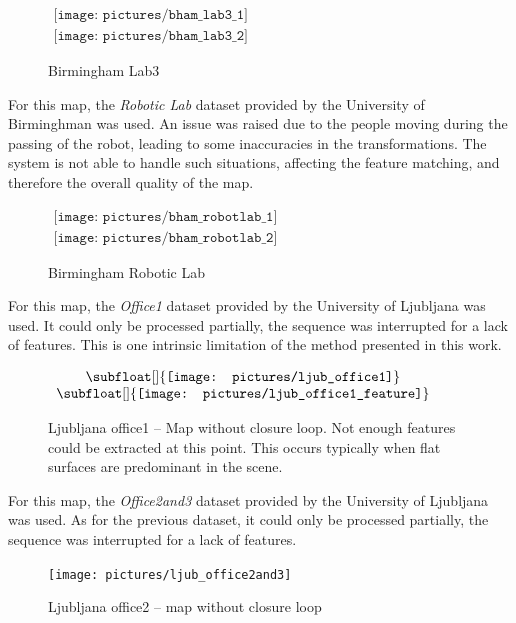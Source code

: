 \begin{figure}[H]
\centering$
 \begin{array}{c}
 \texttt{[image: pictures/bham\_lab3\_1]} \\
 \texttt{[image: pictures/bham\_lab3\_2]}
 \end{array}$
\caption{Birmingham Lab3}
\end{figure}

\clearpage
For this map, the \emph{Robotic Lab} dataset provided by the University of Birminghman was used. An issue was raised due to the people moving during the passing of the robot, leading to some inaccuracies in the transformations. The system is not able to handle such situations, affecting the feature matching, and therefore the overall quality of the map.

\begin{figure}[H]
\centering$
\begin{array}{c}
\texttt{[image: pictures/bham\_robotlab\_1]} \\
\texttt{[image: pictures/bham\_robotlab\_2]}
\end{array}$
\caption{Birmingham Robotic Lab}
\end{figure}

\clearpage
For this map, the \emph{Office1} dataset provided by the University of Ljubljana was used. It could only be processed partially, the sequence was interrupted for a lack of features. This is one intrinsic limitation of the method presented in this work.

\begin{figure}[H]
\centering$
 \begin{array}{c}
 \subfloat[]{\label{fig:ljub1_1} \texttt{[image: pictures/ljub\_office1]}} \\
 \subfloat[]{\label{fig:ljub1_2} \texttt{[image: pictures/ljub\_office1\_feature]}}
 \end{array}$
\caption{Ljubljana office1 -- \protect{} Map without closure loop. \protect{} Not enough features could be extracted at this point. This occurs typically when flat surfaces are predominant in the scene. }
\end{figure}

\clearpage
For this map, the \emph{Office2and3} dataset provided by the University of Ljubljana was used. As for the previous dataset, it could only be processed partially, the sequence was interrupted for a lack of features.

\begin{figure}[H]
\centering
\texttt{[image: pictures/ljub\_office2and3]}
\caption{Ljubljana office2 -- map without closure loop}
\end{figure}

